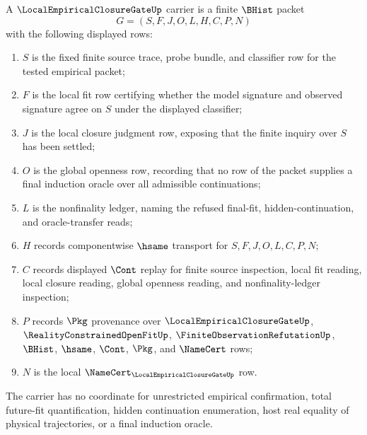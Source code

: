 \begin{definition}
\label{def:local-empirical-closure-gate-carrier}
A $\LocalEmpiricalClosureGateUp$ carrier is a finite $\BHist$ packet
$$
G=(S,F,J,O,L,H,C,P,N)
$$
with the following displayed rows:
\begin{enumerate}
\item $S$ is the fixed finite source trace, probe bundle, and classifier row for the tested empirical packet;
\item $F$ is the local fit row certifying whether the model signature and observed signature agree on $S$ under the displayed classifier;
\item $J$ is the local closure judgment row, exposing that the finite inquiry over $S$ has been settled;
\item $O$ is the global openness row, recording that no row of the packet supplies a final induction oracle over all admissible continuations;
\item $L$ is the nonfinality ledger, naming the refused final-fit, hidden-continuation, and oracle-transfer reads;
\item $H$ records componentwise $\hsame$ transport for $S,F,J,O,L,C,P,N$;
\item $C$ records displayed $\Cont$ replay for finite source inspection, local fit reading, local closure reading, global openness reading, and nonfinality-ledger inspection;
\item $P$ records $\Pkg$ provenance over $\LocalEmpiricalClosureGateUp$, $\RealityConstrainedOpenFitUp$, $\FiniteObservationRefutationUp$, $\BHist$, $\hsame$, $\Cont$, $\Pkg$, and $\NameCert$ rows;
\item $N$ is the local $\NameCert_{\LocalEmpiricalClosureGateUp}$ row.
\end{enumerate}
The carrier has no coordinate for unrestricted empirical confirmation, total future-fit quantification, hidden continuation enumeration, host real equality of physical trajectories, or a final induction oracle.
\end{definition}

